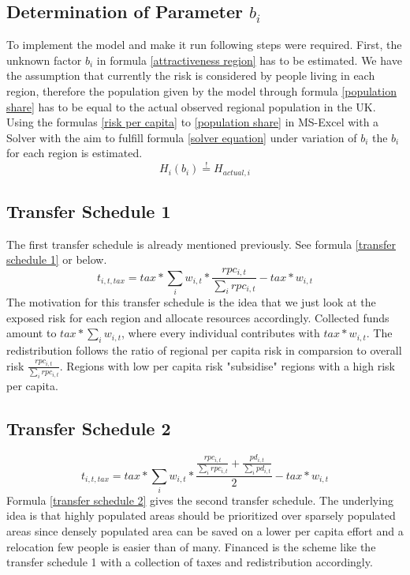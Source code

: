\documentclass[10pt,a4paper]{article}
\begin{document}
\subsection{Determination of Parameter $b_i$}
To implement the model and make it run following steps were required.
First, the unknown factor $b_i$ in formula \ref{attractiveness region} has to be estimated. We have the assumption that currently the risk is considered by people living in each region, therefore the population given by the model through formula \ref{population share} has to be equal to the actual observed regional population in the UK. Using the formulas \ref{risk per capita} to \ref{population share} in MS-Excel with a Solver with the aim to fulfill formula \ref{solver equation} under variation of $b_i$ the $b_i$ for each region is estimated.
\begin{equation}
    H_i(b_i) \stackrel{!}{=}  H_{actual,i}
    \label{solver equation}
\end{equation}

\subsection{Transfer Schedule 1}
The first transfer schedule is already mentioned previously. See formula \ref{transfer schedule 1} or below.
\begin{equation}
    t_{i,t,tax} = tax * \sum_i w_{i,t} * \frac{rpc_{i,t}}{\sum_i rpc_{i,t}} - tax * w_{i,t}
    \label{transfer schedule 1 again}
\end{equation}
The motivation for this transfer schedule is the idea that we just look at the exposed risk for each region and allocate resources accordingly. Collected funds amount to $tax * \sum_i w_{i,t}$, where every individual contributes with $tax * w_{i,t}$. The redistribution follows the ratio of regional per capita risk in comparsion to overall risk $\frac{rpc_{i,t}}{\sum_i rpc_{i,t}}$. Regions with low per capita risk "subsidise" regions with a high risk per capita.

\subsection{Transfer Schedule 2}

\begin{equation}
    t_{i,t,tax} = tax * \sum_i w_{i,t} * \frac{\frac{rpc_{i,t}}{\sum_i rpc_{i,t}} + \frac{pd_{i,t}}{\sum_i pd_{i,t}}}{2} - tax * w_{i,t}
    \label{transfer schedule 2}
\end{equation}
Formula \ref{transfer schedule 2} gives the second transfer schedule. The underlying idea is that highly populated areas should be prioritized over sparsely populated areas since densely populated area can be saved on a lower per capita effort and a relocation few people is easier than of many. Financed is the scheme like the transfer schedule 1 with a collection of taxes and redistribution accordingly. 
\end{document}
